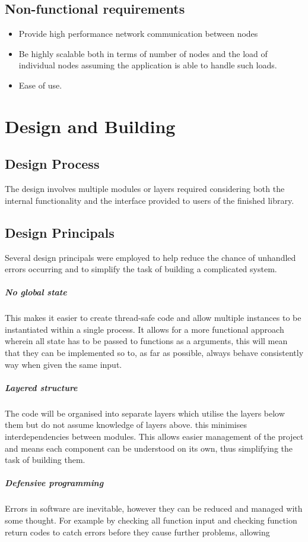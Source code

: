 \documentclass{article}
\begin{document}
\subsection{Non-functional requirements}
\begin{itemize}
\item
Provide high performance network communication between nodes
\item
Be highly scalable both in terms of number of nodes and the load of individual nodes assuming the application is able to handle such loads.
\item
Ease of use.
\end{itemize}

\section{Design and Building}

\subsection{Design Process}

The design involves multiple modules or layers
required considering both the internal functionality and the interface provided to users of the finished library.

\subsection{Design Principals}
Several design principals were employed to help reduce the chance of unhandled errors occurring and to simplify the task of building a complicated system.

\subparagraph{No global state}
This makes it easier to create thread-safe code and allow multiple instances to be instantiated within a single process. It allows for a more functional approach wherein all state has to be passed to functions as a arguments, this will mean that they can be implemented so to, as far as possible, always behave consistently way when given the same input.

\subparagraph{Layered structure}
The code will be organised into separate layers which utilise the layers below them but do not assume knowledge of layers above. this minimises interdependencies between modules.
This allows easier management of the project and means each component can be understood on its own, thus simplifying the task of building them.

\subparagraph{Defensive programming}
Errors in software are inevitable, however they can be reduced and managed with some thought. For example by checking all function input and checking function return codes to catch errors before they cause further problems, allowing
\end{document}
